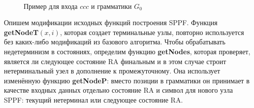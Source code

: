 \begin{figure}[ht]   
	\centering
	~
	\caption{Пример для входа $ ccc $ и грамматики $G_0$}
	\label{fig:fig01}
\end{figure}
Опишем модификации исходных функций построения SPPF.
Функция \textbf{getNodeT$ (x, i) $}, которая создает терминальные узлы, 
повторно используется без каких-либо модификаций из базового алгоритма.
Чтобы обрабатывать недетерминизм в состояниях, определим функцию 
\textbf{getNodes}, которая проверяет, является ли следующее состояние RA финальным
и в этом случае строит нетерминальный узел в дополнение к промежуточному.
Она использует изменённую функцию \textbf{getNodeP}: вместо позиции в грамматики он 
принимает в качестве входных данных отдельно состояние RA и символ для нового узла SPPF:
текущий нетерминал или следующее состояние RA.

